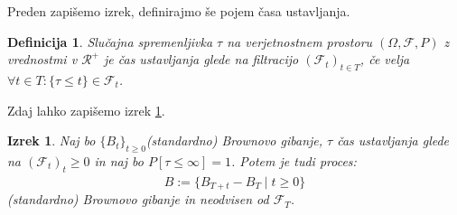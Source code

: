 \documentclass[11pt]{article}
\newtheorem{definicija}{Definicija}
\newtheorem{thereom}{Izrek}
\newcommand{\f}{\mathcal{F}}
\begin{document}
    Preden zapišemo izrek, definirajmo še pojem časa ustavljanja.
    
    \begin{definicija}%
    Slučajna spremenljivka $\tau$ na verjetnostnem prostoru $(\Omega,\f,P)$ z vrednostmi v $\mathcal{R}^+$
    je čas ustavljanja glede na filtracijo $(\f_t)_{t\in T}$, če velja $\forall t \in T: \{ \tau  \le  t \} \in \f_t$.
    \end{definicija}%
    
    Zdaj lahko zapišemo izrek \ref{thm:stopped_brownian}. %
    
    \begin{thereom} \label{thm:stopped_brownian} %
    Naj bo $\{B_t\}_{t \geq 0} $(standardno) Brownovo gibanje, $\tau$ čas ustavljanja glede na 
    $(\f_t)_t\ge 0$ in naj bo $P[\tau \le \infty]=1$.
    Potem je tudi proces:
    \[
    \hat{B} := \{B_{T+t} - B_T \mid t \geq 0\}
    \]
    (standardno) Brownovo gibanje in neodvisen od $\f_T$.
    \end{thereom} %
    
    
\end{document}
